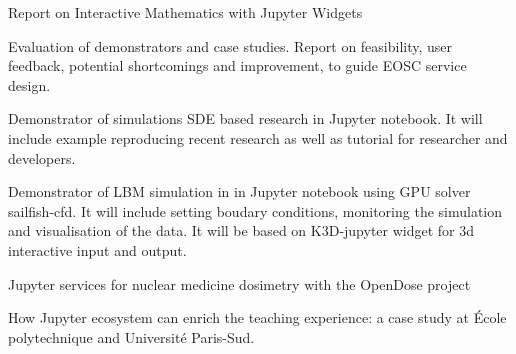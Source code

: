 \begin{workpackage}
\begin{wpdelivs}
\begin{wpdeliv}[due=36,miles=final,id=math,dissem=PU,nature=R,lead=UPSUD]
  {Report on Interactive Mathematics with Jupyter Widgets}
\end{wpdeliv}
\begin{wpdeliv}[due=48,miles=final,id=applications-report,dissem=PU,nature=R,lead=XFEL]
  {Evaluation of demonstrators and case studies. Report on
    feasibility, user feedback, potential shortcomings and
    improvement, to guide EOSC service design.}
\end{wpdeliv}
\begin{wpdeliv}[due=24,miles=final,id=lbm-jupyter,dissem=PU,nature=DEM,lead=SIL]
  {Demonstrator of simulations  SDE based research in Jupyter notebook. It will include example reproducing recent research as well as tutorial for researcher and developers.}
\end{wpdeliv}
\begin{wpdeliv}[due=36,miles=final,id=sde-jupyter,dissem=PU,nature=DEM,lead=SIL]
  { Demonstrator of LBM simulation in in Jupyter notebook using GPU solver sailfish-cfd. It will include setting boudary conditions, monitoring the simulation and visualisation of the data. It will be based on K3D-jupyter widget for 3d interactive input and output.}
\end{wpdeliv}


\begin{wpdeliv}[due=36,miles=final,id=opendose-analysis,dissem=PU,nature=DEM,lead=INSERM]
  {Jupyter services for nuclear medicine dosimetry with the OpenDose project}
\end{wpdeliv}

\begin{wpdeliv}[due=48,miles=final,id=teaching,dissem=PU,nature=R,lead=EP]
  {How Jupyter ecosystem can enrich the teaching experience: a case study at \'Ecole polytechnique and Université Paris-Sud.}
\end{wpdeliv}

\end{wpdelivs}
\end{workpackage}

